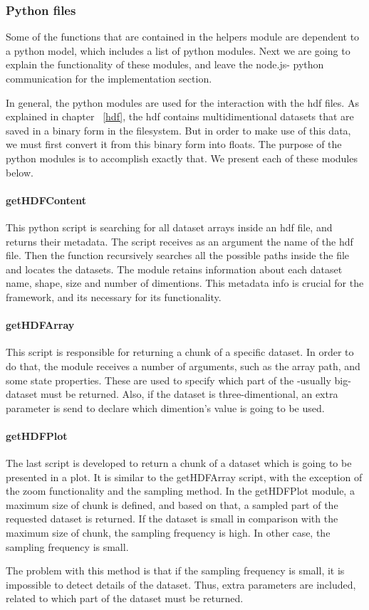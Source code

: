 \subsubsection{Python files}
Some of the functions that are contained in the helpers module are dependent to a python model, which includes a list of python modules. Next we are going to explain the functionality of these modules, and leave the node.js- python communication for the implementation section. \par 
	In general, the python modules are used for the interaction with the hdf files. As explained in chapter ~\ref{hdf}, the hdf contains multidimentional datasets that are saved in a binary form in the filesystem. But in order to make use of this data, we must first convert it from this binary form into floats. The purpose of the python modules is to accomplish exactly that. We present each of these modules below.
	
\paragraph{getHDFContent}
This python script is searching for all dataset arrays inside an hdf file, and returns their metadata. The script receives as an argument the name of the hdf file. Then the function recursively searches all the possible paths inside the file and locates the datasets. The module retains information about each dataset name, shape, size and number of dimentions. This metadata info is crucial for the framework, and its necessary for its functionality.

\paragraph{getHDFArray}
This script is responsible for returning a chunk of a specific dataset. In order to do that, the module receives a number of arguments, such as the array path, and some state properties. These are used to specify which part of the -usually big- dataset must be returned. Also, if the dataset is three-dimentional, an extra parameter is send to declare which dimention's value is going to be used.

\paragraph{getHDFPlot}
The last script is developed to return a chunk of a dataset which is going to be presented in a plot. It is similar to the getHDFArray script, with the exception of the zoom functionality and the sampling method. In the getHDFPlot module, a maximum size of chunk is defined, and based on that, a sampled part of the requested dataset is returned. If the dataset is small in comparison with the maximum size of chunk, the sampling frequency is high. In other case, the sampling frequency is small. \par 
	The problem with this method is that if the sampling frequency is small, it is impossible to detect details of the dataset. Thus, extra parameters are included, related to which part of the dataset must be returned.
	

